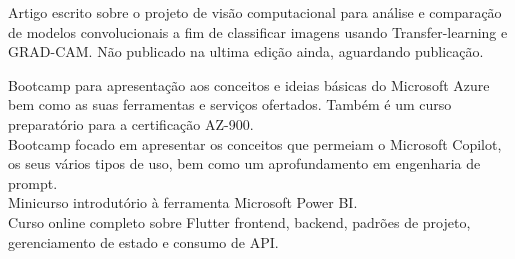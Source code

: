 \documentclass[
    10pt,
    english,
]{article}
\begin{document}

{Artigo escrito sobre o projeto de visão computacional para análise e comparação de modelos convolucionais a fim de classificar imagens usando Transfer-learning e GRAD-CAM. Não publicado na ultima edição ainda, aguardando publicação.}


{Bootcamp para apresentação aos conceitos e ideias básicas do Microsoft Azure bem como as suas ferramentas e serviços ofertados. Também é um curso preparatório para a certificação AZ-900.}
\\
\noindent {}
{Bootcamp focado em apresentar os conceitos que permeiam o Microsoft Copilot, os seus vários tipos de uso, bem como um aprofundamento em engenharia de prompt.}
\\
\noindent {}
{Minicurso introdutório à ferramenta Microsoft Power BI.}
\\
\noindent {}
{Curso online completo sobre Flutter frontend, backend, padrões de projeto, gerenciamento de estado e consumo de API.}

\end{document}
